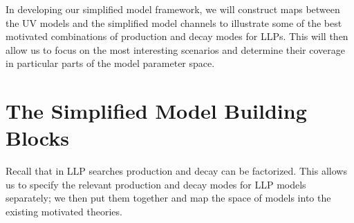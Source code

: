 %
In developing our simplified model framework, we will construct maps between the UV models and the simplified model channels to illustrate some of the best motivated combinations of production and decay modes for LLPs. This will then allow us to focus on the most interesting scenarios and determine their coverage in particular parts of the model parameter space.

\section{The Simplified Model Building Blocks}\label{sec:building_blocks}

Recall that in LLP searches production and decay can be factorized. This allows us to specify the relevant production and decay modes for LLP models separately; we then put them together and map the space of models into the existing motivated theories.

